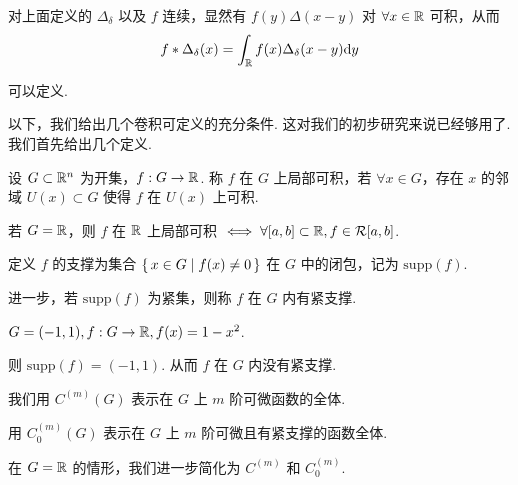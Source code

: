 \begin{example}
    对上面定义的 $\Delta_\delta$ 以及 $f$ 连续，显然有 $f(y)\Delta(x-y)$ 对 $\forall x\in\mathbb{R}$ 可积，从而
$$
f*\Delta_\delta(x)=\int_{\mathbb{R}} f(x)\Delta_\delta(x-y)\mathrm{d} y
$$

    可以定义.
\end{example}

以下，我们给出几个卷积可定义的充分条件. 这对我们的初步研究来说已经够用了. 我们首先给出几个定义.

\begin{definition}
    设 $G\subset\mathbb{R}^n$ 为开集，$f:G\to\mathbb{R}$. 称 $f$ 在 $G$ 上局部可积，若 $\forall x\in G$，存在 $x$ 的邻域 $U(x)\subset G$ 使得 $f$ 在 $U(x)$ 上可积.
\end{definition}

若 $G=\mathbb{R}$，则 $f$ 在 $\mathbb{R}$ 上局部可积 $\iff\forall [a,b]\subset\mathbb{R},f\in\mathcal{R}[a,b]$.

\begin{definition}
    定义 $f$ 的支撑为集合 $\set{x\in G|f(x)\ne 0}$ 在 $G$ 中的闭包，记为 $\mathrm{supp}(f)$.
    
    进一步，若 $\mathrm{supp}(f)$ 为紧集，则称 $f$ 在 $G$ 内有紧支撑.
\end{definition}

\begin{example}
    $G=(-1,1),f:G\to\mathbb{R},f(x)=1-x^2$.

    则 $\mathrm{supp}(f)=(-1,1)$. 从而 $f$ 在 $G$ 内没有紧支撑.
\end{example}

我们用 $C^{(m)}(G)$ 表示在 $G$ 上 $m$ 阶可微函数的全体.

用 $C^{(m)}_0(G)$ 表示在 $G$ 上 $m$ 阶可微且有紧支撑的函数全体.

在 $G=\mathbb{R}$ 的情形，我们进一步简化为 $C^{(m)}$ 和 $C^{(m)}_0$.


